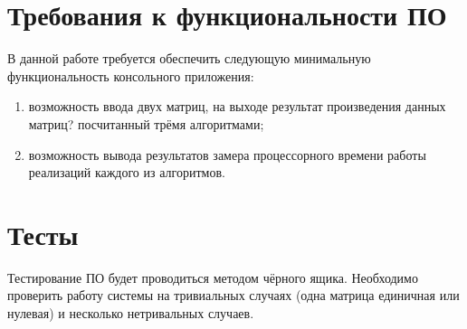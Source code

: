     \section{Требования к функциональности ПО}
        В данной работе требуется обеспечить следующую минимальную функциональность консольного приложения:
        \begin{enumerate}
            \item возможность ввода двух матриц, на выходе результат произведения данных матриц? посчитанный трёмя алгоритмами;
            \item возможность вывода результатов замера процессорного времени работы реализаций каждого из алгоритмов. 
        \end{enumerate}

    \section{Тесты}
    Тестирование ПО будет проводиться методом чёрного ящика. Необходимо проверить работу системы 
    на тривиальных случаях (одна матрица единичная или нулевая) 
    и несколько нетривальных случаев.


\newpage